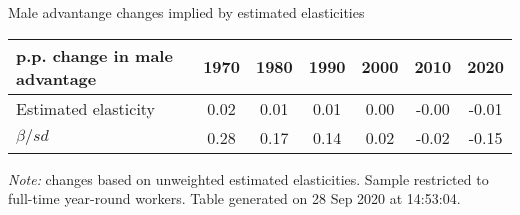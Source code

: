 \begin{center}
\begin{threeparttable}[!h]
\caption{Male advantange changes implied by estimated elasticities}
\label{tab:IC}
\begin{tabular}{lcccccc}
\toprule
\toprule
\textbf{p.p. change in male advantage}&\multicolumn{1}{c}{\textbf{1970}}&\multicolumn{1}{c}{\textbf{1980}}&\multicolumn{1}{c}{\textbf{1990}}&\multicolumn{1}{c}{\textbf{2000}}&\multicolumn{1}{c}{\textbf{2010}}&\multicolumn{1}{c}{\textbf{2020}} \\
\midrule
Estimated elasticity&        0.02         &        0.01         &        0.01         &        0.00         &       -0.00         &       -0.01         \\
$ \beta / sd $      &        0.28         &        0.17         &        0.14         &        0.02         &       -0.02         &       -0.15         \\
\bottomrule
\bottomrule
\end{tabular}
\begin{tablenotes}
\item \footnotesize \textit{Note:} changes based on unweighted estimated elasticities. Sample restricted to full-time year-round workers. Table generated on 28 Sep 2020 at 14:53:04.
\end{tablenotes}
\end{threeparttable}
\end{center}
